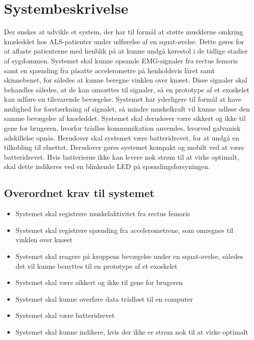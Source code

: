 \section{Systembeskrivelse}
Der ønskes at udvikle et system, der har til formål at støtte musklerne omkring knæleddet hos ALS-patienter under udførelse af en squat-øvelse. Dette gøres for at aflaste patienterne med henblik på at kunne undgå kørestol i de tidlige stadier af sygdommen. 
Systemet skal kunne opsamle EMG-signaler fra rectus femoris samt en spænding fra påsatte accelerometre på henholdsvis låret samt skinnebenet, for således at kunne beregne vinklen over knæet. Disse signaler skal behandles således, at de kan omsættes til signaler, så en prototype af et exoskelet kan udføre en tilsvarende bevægelse. 
Systemet har yderligere til formål at have mulighed for forstærkning af signalet, så mindre muskelkraft vil kunne udløse den samme bevægelse af knæleddet. 
Systemet skal derudover være sikkert og ikke til gene for brugeren, hvorfor trådløs kommunikation anvendes, hvorved galvanisk adskillelse opnås. Herudover skal systemet være batteridrevet, for at undgå en tilkobling til elnettet. Derudover gøres systemet kompakt og mobilt ved at være batteridrevet. Hvis batterierne ikke kan levere nok strøm til at virke optimalt, skal dette indikeres ved en blinkende LED på spændingsforsyningen. 

\subsection{Overordnet krav til systemet}  \label{sec:overordnet_krav}
\begin{itemize}
\item Systemet skal registrere muskelaktivitet fra rectus femoris 
\item Systemet skal registrere spænding fra accelerometrene, som omregnes til vinklen over knæet
\item Systemet skal reagere på kroppens bevægelse under en squat-øvelse, således det vil kunne benyttes til en prototype af et exoskelet
\item Systemet skal være sikkert og ikke til gene for brugeren 
\item Systemet skal kunne overføre data trådløst til en computer
\item Systemet skal være batteridrevet
\item Systemet skal kunne indikere, hvis der ikke er strøm nok til at virke optimalt

\end{itemize}


